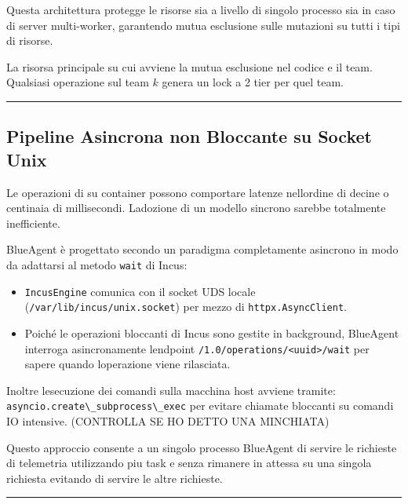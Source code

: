Questa architettura protegge le risorse sia a livello di singolo
processo sia in caso di server multi-worker, garantendo mutua esclusione
sulle mutazioni su tutti i tipi di risorse.

La risorsa principale su cui avviene la mutua esclusione nel codice
e\textquotesingle{} il team. Qualsiasi operazione sul team \(k\) genera
un lock a 2 tier per quel team.

\begin{center}\rule{0.5\linewidth}{0.5pt}\end{center}

\subsection{Pipeline Asincrona non Bloccante su Socket
Unix}\label{pipeline-asincrona-non-bloccante-su-socket-unix}

Le operazioni di su container possono comportare latenze
nell\textquotesingle ordine di decine o centinaia di millisecondi.
L\textquotesingle adozione di un modello sincrono sarebbe totalmente
inefficiente.

BlueAgent è progettato secondo un paradigma completamente asincrono in
modo da adattarsi al metodo \passthrough{\lstinline!wait!} di Incus:

\begin{itemize}
\tightlist
\item
  \passthrough{\lstinline!IncusEngine!} comunica con il socket UDS
  locale (\passthrough{\lstinline!/var/lib/incus/unix.socket!}) per
  mezzo di \passthrough{\lstinline!httpx.AsyncClient!}.
\item
  Poiché le operazioni bloccanti di Incus sono gestite in background,
  BlueAgent interroga asincronamente l\textquotesingle endpoint
  \passthrough{\lstinline!/1.0/operations/<uuid>/wait!} per sapere
  quando l\textquotesingle operazione viene rilasciata.
\end{itemize}

Inoltre l\textquotesingle esecuzione dei comandi sulla macchina host
avviene tramite:
\passthrough{\lstinline!asyncio.create\_subprocess\_exec!} per evitare
chiamate bloccanti su comandi IO intensive. (CONTROLLA SE HO DETTO UNA
MINCHIATA)

Questo approccio consente a un singolo processo BlueAgent di servire le
richieste di telemetria utilizzando piu task e senza rimanere in attessa
su una singola richiesta evitando di servire le altre richieste.

\begin{center}\rule{0.5\linewidth}{0.5pt}\end{center}

